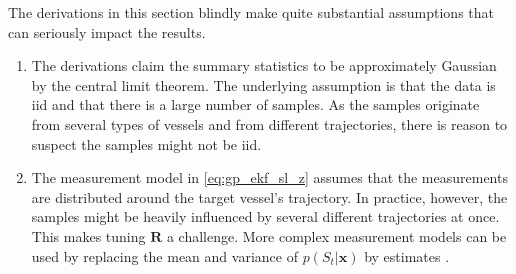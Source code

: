 The derivations in this section blindly make quite substantial assumptions that can seriously impact the results.
\begin{enumerate}
    \item The derivations claim the summary statistics to be approximately Gaussian by the central limit theorem. The underlying assumption is that the data is \acrshort{iid} and that there is a large number of samples. As the samples originate from several types of vessels and from different trajectories, there is reason to suspect the samples might not be \acrshort{iid}.
    \item The measurement model in \cref{eq:gp_ekf_sl_z} assumes that the measurements are distributed around the target vessel's trajectory. In practice, however, the samples might be heavily influenced by several different trajectories at once. This makes tuning $\boldsymbol{R}$ a challenge. More complex measurement models can be used by replacing the mean and variance of $p(S_t | \boldsymbol{x})$ by estimates \cite{frazier2021bayesian}.
\end{enumerate}


